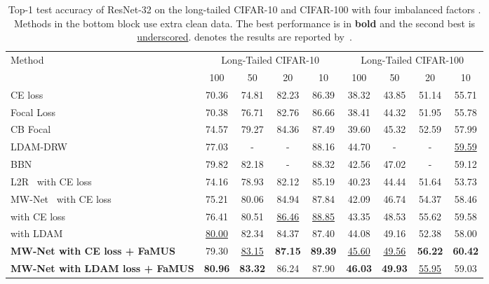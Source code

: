 \documentclass[final]{cvpr}
\begin{document}
\begin{table*}[ht]
	\centering
	\small
	\begin{tabular}{|l|c|c|c|c|c|c|c|c|}
		\hline
		\multirow{2}{*}{Method} & \multicolumn{4}{c|}{Long-Tailed CIFAR-10} & \multicolumn{4}{c|}{Long-Tailed CIFAR-100} \\
		\cline{2-9}
		 & 100 & 50 & 20 & 10 & 100 & 50 & 20 & 10 \\
		\hline
		CE loss & 70.36 & 74.81 & 82.23 & 86.39 & 38.32 & 43.85 & 51.14 & 55.71 \\
		\hline
		Focal Loss~\cite{lin2017focal} & 70.38 & 76.71 & 82.76 & 86.66 & 38.41 & 44.32 & 51.95 & 55.78 \\
		\hline
		CB Focal~\cite{cui2019class} & 74.57 & 79.27 & 84.36 & 87.49 & 39.60 & 45.32 & 52.59 & 57.99 \\
		
		\hline
		LDAM-DRW~\cite{cao2019learning}  & 77.03 & - & - & 88.16 & 44.70 & - & - & \underline{59.59} \\
		\hline
		BBN~\cite{zhou2020bbn} & 79.82 & 82.18 & - & 88.32 & 42.56 & 47.02 & - & 59.12 \\
		\hline\hline
		
		L2R~\cite{ren2018learning} with CE loss & 74.16 & 78.93 & 82.12 & 85.19 & 40.23 & 44.44 & 51.64 & 53.73 \\
 		\hline
		MW-Net~\cite{shu2019meta} with CE loss & 75.21 & 80.06 & 84.94 & 87.84 & 42.09 & 46.74 & 54.37 & 58.46 \\ \hline                       		                        
		\cite{Jamal_2020_CVPR} with CE loss  &    76.41 & 80.51 & \underline{86.46} & \underline{88.85} &  43.35 & 48.53 & 55.62 & 59.58 \\
        \hline
		\cite{Jamal_2020_CVPR} with LDAM  & \underline{80.00} & 82.34 & 84.37 & 87.40 & 44.08 & 49.16 & 52.38 & 58.00 \\
		\hline
        \textbf{MW-Net with CE loss + FaMUS} & 79.30 & \underline{83.15} & \textbf{87.15} & \textbf{89.39} & \underline{45.60}	 & \underline{49.56} & \textbf{56.22} & \textbf{60.42} \\
		\hline
		\textbf{MW-Net with LDAM loss + FaMUS} & \textbf{80.96} & \textbf{83.32} & 86.24 & 87.90 & \textbf{46.03} & \textbf{49.93} & \underline{55.95}  & 59.03 \\
		\hline
	\end{tabular}\vspace{-3mm}
	\caption{Top-1 test accuracy of ResNet-32 on the long-tailed CIFAR-10 and CIFAR-100 with four imbalanced factors . Methods in the bottom block use extra clean data. The best performance is in \textbf{bold} and the second best is \underline{underscored}.  denotes the results are reported by~\cite{cao2019learning}. }\label{tab:long_tailed_cifar}
	\vspace{-2mm}
\end{table*}
 
\end{document}
